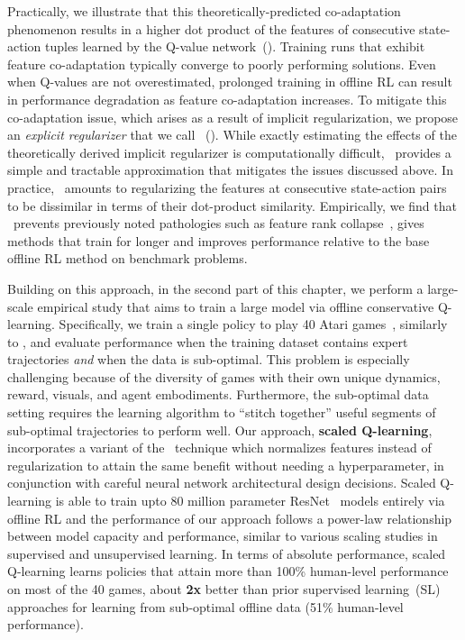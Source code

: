 Practically, we illustrate that this theoretically-predicted co-adaptation phenomenon results in a higher dot product of the features of consecutive state-action tuples learned by the Q-value network~(). Training runs that exhibit feature co-adaptation typically converge to poorly performing solutions. Even when Q-values are not overestimated, prolonged training in offline RL can result in performance degradation as feature co-adaptation increases. To mitigate this co-adaptation issue, which arises as a result of implicit regularization, we propose an \emph{explicit regularizer} that we call \drmethodname~(). While exactly estimating the effects of the theoretically derived implicit regularizer is computationally difficult, \drmethodname\ provides a simple and tractable approximation that mitigates the issues discussed above. In practice, \drmethodname\ amounts to regularizing the features at consecutive state-action pairs to be dissimilar in terms of their dot-product similarity. Empirically, we find that \drmethodname\ prevents previously noted pathologies such as feature rank collapse~\citep{kumar2021implicit}, gives methods that train for longer and improves performance relative to the base offline RL method on benchmark problems.

Building on this approach, in the second part of this chapter, we perform a large-scale empirical study that aims to train a large model via offline conservative Q-learning. Specifically, we train a single policy to play 40 Atari games~\citep{bellemare2013arcade}, similarly to \citet{lee2022multi}, and evaluate performance when the training dataset contains expert trajectories \emph{and} when the data is sub-optimal. This problem is especially challenging because of the diversity of games with their own unique dynamics, reward, visuals, and agent embodiments. Furthermore, the sub-optimal data setting requires the learning algorithm to ``stitch together'' useful segments of sub-optimal trajectories to perform well. Our approach, \textbf{scaled Q-learning}, incorporates a variant of the \drmethodname\ technique which normalizes features instead of regularization to attain the same benefit without needing a hyperparameter, in conjunction with careful neural network architectural design decisions. Scaled Q-learning is able to train upto 80 million parameter ResNet~\citep{he2016resnet} models entirely via offline RL and the performance of our approach follows a power-law relationship between model capacity and performance, similar to various scaling studies in supervised and unsupervised learning. In terms of absolute performance, scaled Q-learning learns policies that attain more than 100\% human-level performance on most of the 40 games, about \textbf{2x} better than prior supervised learning~(SL) approaches for learning from sub-optimal offline data (51\% human-level performance).    

